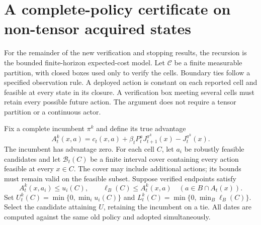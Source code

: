 \section{A complete-policy certificate on non-tensor acquired states}\label{sec:certificates56}
For the remainder of the new verification and stopping results, the recursion is the bounded finite-horizon expected-cost model. Let $\mathcal C$ be a finite measurable partition, with closed boxes used only to verify the cells. Boundary ties follow a specified observation rule. A deployed action is constant on each reported cell and feasible at every state in its closure. A verification box meeting several cells must retain every possible future action. The argument does not require a tensor partition or a continuous actor.

Fix a complete incumbent $\pi^k$ and define its true advantage
\[
 A_t^k(x,a)=c_t(x,a)+\beta_tP_t^aJ_{t+1}^{\pi^k}(x)-J_t^{\pi^k}(x).
\]
The incumbent has advantage zero. For each cell $C$, let $a_i$ be robustly feasible candidates and let $\mathcal B_t(C)$ be a finite interval cover containing every action feasible at every $x\in C$. The cover may include additional actions; its bounds must remain valid on the feasible subset. Suppose verified endpoints satisfy
\[
 A_t^k(x,a_i)\le u_i(C),\qquad
 \ell_B(C)\le A_t^k(x,a)\quad(a\in B\cap A_t(x)).
\]
Set $U_t^k(C)=\min\{0,\min_i u_i(C)\}$ and $L_t^k(C)=\min\{0,\min_B\ell_B(C)\}$. Select the candidate attaining $U$, retaining the incumbent on a tie. All dates are computed against the same old policy and adopted simultaneously.

